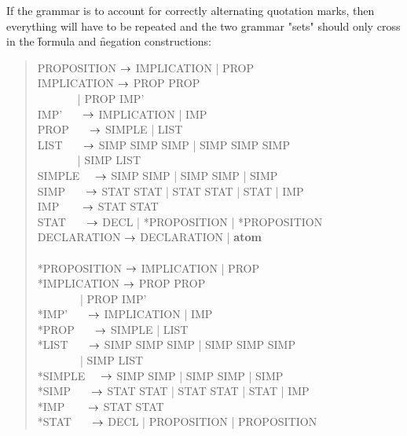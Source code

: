 \documentclass[a4paper]{article}
\begin{document}
If the grammar is to account for correctly alternating quotation marks,
then everything will have to be repeated and the two grammar "sets" should
only cross in the \f{formula} and \f{negation} constructions:
\begin{quote}
\ttfamily
PROPOSITION $\rightarrow$ IMPLICATION | PROP\\
IMPLICATION $\rightarrow$  PROP  PROP\\
\(~~~~~~~~~~~~~~~\) |
 PROP  IMP'\\
IMP' \(~~~~~~~\)$\rightarrow$ IMPLICATION | IMP \\
PROP \(~~~~~~~\)$\rightarrow$ SIMPLE | LIST \\
LIST \(~~~~~~~\)$\rightarrow$ SIMP\txt{, } SIMP SIMP |
                      SIMP\txt{, } SIMP SIMP\\
\(~~~~~~~~~~~~~~~\) | SIMP\txt{, } LIST\\
SIMPLE \(~~~~~\)$\rightarrow$ SIMP  SIMP |
                      SIMP  SIMP  | SIMP\\
SIMP \(~~~~~~~\)$\rightarrow$ STAT  STAT | STAT  STAT | STAT
                    | IMP\\
IMP \(~~~~~~~~\)$\rightarrow$ STAT  STAT\\
STAT \(~~~~~~~\)$\rightarrow$ DECL | *PROPOSITION |
                      *PROPOSITION\\
DECLARATION $\rightarrow$ DECLARATION | {\bf atom}\\
~\\
*PROPOSITION $\rightarrow$ IMPLICATION | PROP\\
*IMPLICATION $\rightarrow$  PROP  PROP\\
\(~~~~~~~~~~~~~~~~\) |
 PROP  IMP'\\
*IMP' \(~~~~~~~\)$\rightarrow$ IMPLICATION | IMP \\
*PROP \(~~~~~~~\)$\rightarrow$ SIMPLE | LIST \\
*LIST \(~~~~~~~\)$\rightarrow$ SIMP\txt{, } SIMP SIMP |
                      SIMP\txt{, } SIMP SIMP\\
\(~~~~~~~~~~~~~~~~\) | SIMP\txt{, } LIST\\
*SIMPLE \(~~~~~\)$\rightarrow$ SIMP  SIMP |
                      SIMP  SIMP  | SIMP\\
*SIMP \(~~~~~~~\)$\rightarrow$ STAT  STAT | STAT  STAT | STAT
                    | IMP\\
*IMP \(~~~~~~~~\)$\rightarrow$ STAT  STAT\\
*STAT \(~~~~~~~\)$\rightarrow$ DECL | PROPOSITION |
                      PROPOSITION\\
\end{quote}
\end{document}
